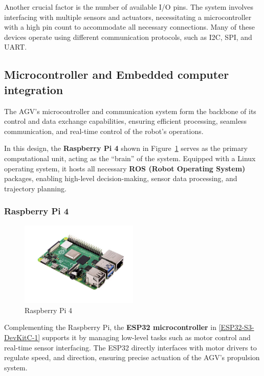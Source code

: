 \documentclass[../../main]{subfiles}
\begin{document}
Another crucial factor is the number of available I/O pins. The 
system involves interfacing with multiple sensors and actuators, 
necessitating a microcontroller with a high pin count to 
accommodate all necessary connections. Many of these devices 
operate using different communication protocols, such as I2C, 
SPI, and UART.

\subsection{Microcontroller and Embedded computer integration}

The AGV's microcontroller and communication system form the backbone 
of its control and data exchange capabilities, ensuring efficient 
processing, seamless communication, and real-time control of the 
robot's operations. 

In this design, the \textbf{Raspberry Pi 4} shown in Figure~\cref{Raspberry Pi 4} serves as the primary 
computational unit, acting as the ``brain'' of the system. Equipped 
with a Linux operating system, it hosts all necessary 
\textbf{ROS (Robot Operating System)} packages, enabling high-level 
decision-making, sensor data processing, and trajectory planning.


\subsubsection{Raspberry Pi 4}

\begin{figure}[H]
    \centering
    \includegraphics[width=0.5\textwidth]{fig/raspberry.png}
    \caption{ Raspberry Pi 4}
    \label{Raspberry Pi 4} %
\end{figure}

Complementing the Raspberry Pi, the \textbf{ESP32 microcontroller} in \cref{ESP32-S3-DevKitC-1} 
supports it by managing low-level tasks 
such as motor control and real-time sensor interfacing. The ESP32 
directly interfaces with motor drivers to regulate speed, 
and direction, ensuring precise actuation of the AGV's propulsion 
system.
\end{document}
